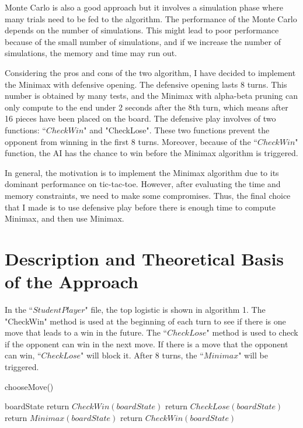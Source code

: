 \documentclass[a4paper,titlepage]{article}
\begin{document}
Monte Carlo is also a good approach but it involves a simulation phase where many trials need to be fed to the algorithm. The performance of the Monte Carlo depends on the number of simulations. This might lead to poor performance because of the small number of simulations, and if we increase the number of simulations, the memory and time may run out.

Considering the pros and cons of the two algorithm, I have decided to implement the Minimax with defensive opening. The defensive opening lasts 8 turns. This number is obtained by many tests, and the Minimax with alpha-beta pruning can only compute to the end under 2 seconds after the 8th turn, which means after 16 pieces have been placed on the board. The defensive play involves of two functions: ``$CheckWin$" and "CheckLose". These two functions prevent the opponent from winning in the first 8 turns. Moreover, because of the ``$CheckWin$" function, the AI has the chance to win before the Minimax algorithm is triggered.

In general, the motivation is to implement the Minimax algorithm due to its dominant performance on tic-tac-toe. However, after evaluating the time and memory constraints, we need to make some compromises. Thus, the final choice that I made is to use defensive play before there is enough time to compute Minimax, and then use Minimax.

\section{Description and Theoretical Basis of the Approach}
In the ``$StudentPlayer$" file, the top logistic is shown in algorithm 1. The "CheckWin" method is used at the beginning of each turn to see if there is one move that leads to a win in the future. The ``$CheckLose$" method is used to check if the opponent can win in the next move. If there is a move that the opponent can win, ``$CheckLose$" will block it. After 8 turns, the ``$Minimax$" will be triggered.
\begin{algorithm}[H]
    \begin{algorithmic}[1]
    \small
        \caption{chooseMove()} \label{algorithm: choose}
        \Require boardState
         \State return $CheckWin(boardState)$
         \Else
         \State return $CheckLose(boardState)$
         \EndIf
        \Else
        \State return $Minimax(boardState)$
        \Else 
        \State return $CheckWin(boardState)$
        \EndIf
        \EndIf
        \end{algorithmic}
\end{algorithm}
\end{document}
